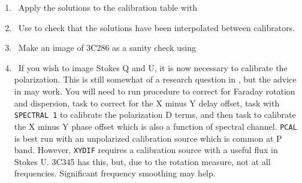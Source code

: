 \begin{enumerate}
\item\ Apply the solutions to the calibration table with {\tt
    }

\item\ Use {\tt {}} to check that the solutions have been
   interpolated between calibrators.

\item\ Make an image of 3C286 as a sanity check using {\tt {}}

\item\ If you wish to image Stokes Q and U, it is now necessary to
  calibrate the polarization.  This is still somewhat of a research
  question in \AIPS, but the advice in  may work.  You
  will need to run procedure {\tt {}} to correct for
  Faraday rotation and dispersion, task {\tt {}} to correct
  for the X minus Y delay offset, task {\tt {}} with {\tt
    SPECTRAL 1} to calibrate the polarization D terms, and then task
  {\tt {}} to calibrate the X minus Y phase offset which is
  also a function of spectral channel.  {\tt PCAL} is best run with an
  unpolarized calibration source which is common at P band.  However,
  {\tt XYDIF} requires a calibration source with a useful flux in
  Stokes U\@.  3C345 has this, but, due to the rotation measure, not
  at all frequencies.  Significant frequency smoothing may help.


\end{enumerate}
